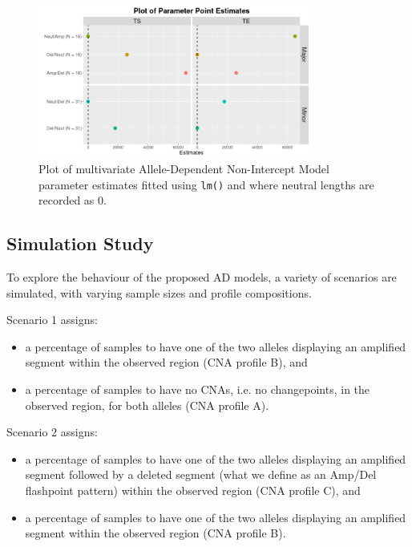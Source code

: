 \begin{figure}[H]  
\centering
\includegraphics[width = 0.8\textwidth]{../figures/Chapter_5/Multivariate_lm_6_AD_Interval.png}
 
\caption[Plot of multivariate Allele-Dependent Non-Intercept Model parameter estimates fitted using \texttt{lm()}.]{Plot of multivariate Allele-Dependent Non-Intercept Model parameter estimates fitted using \texttt{lm()} and where neutral lengths are recorded as 0.}
\label{fig:lm_multi_AD_modpred_6}
\end{figure} 

\subsection{Simulation Study}
To explore the behaviour of the proposed AD models, a variety of scenarios are simulated, with varying sample sizes and profile compositions.
\newline

Scenario 1 assigns:
\begin{itemize}
\item a percentage of samples to have one of the two alleles displaying an amplified segment within the observed region (CNA profile B), and 
\item a percentage of samples to  have no CNAs, i.e. no changepoints, in the observed region, for both alleles (CNA profile A). 
\end{itemize}

Scenario 2 assigns:
\begin{itemize}
\item a percentage of samples to have one of the two alleles displaying an amplified segment followed by a deleted segment (what we define as an Amp/Del flashpoint pattern) within the observed region (CNA profile C), and 
\item a percentage of samples to have one of the two alleles displaying an amplified segment within the observed region (CNA profile B).
\end{itemize}

